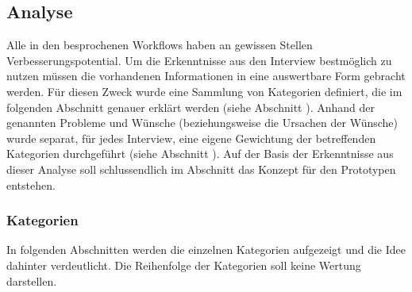 \documentclass[Bachelorarbeit.tex]{subfiles}
\begin{document}
\subsection{Analyse}
\label{AnalyseInterviews}
Alle in den  besprochenen Workflows haben an gewissen Stellen Verbesserungspotential. 
Um die Erkenntnisse aus den Interview bestmöglich zu nutzen müssen die vorhandenen Informationen in eine auswertbare Form gebracht werden.
Für diesen Zweck wurde eine Sammlung von Kategorien definiert, die im folgenden Abschnitt genauer erklärt werden (siehe Abschnitt ).
Anhand der genannten Probleme und Wünsche (beziehungsweise die Ursachen der Wünsche) wurde separat, für jedes Interview, eine eigene Gewichtung der betreffenden Kategorien durchgeführt (siehe Abschnitt ). 
Auf der Basis der Erkenntnisse aus dieser Analyse soll schlussendlich im Abschnitt  das Konzept für den Prototypen entstehen.


\subsubsection{Kategorien}
\label{analyse:kategorien}
In folgenden Abschnitten werden die einzelnen Kategorien aufgezeigt und die Idee dahinter verdeutlicht.
Die Reihenfolge der Kategorien soll keine Wertung darstellen.

\end{document}
